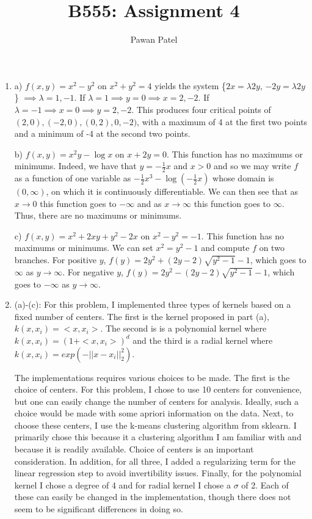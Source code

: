 \documentclass[12pt]{article}
\theoremstyle{plain}
\theoremstyle{definition}
\begin{document}
 

\title{B555: Assignment 4}
\author{Pawan Patel}
\maketitle

\begin{enumerate}


\item
a) $f(x,y) = x^2-y^2$ on $x^2+y^2=4$ yields the system \{$2x=\lambda 2y$, $-2y = \lambda 2y$\} $\implies \lambda = 1, -1$. If $\lambda =1 \implies y=0 \implies x = 2, -2$. If $\lambda = -1 \implies x=0 \implies y=2, -2$. This produces four critical points of $(2,0), (-2,0), (0,2), 0,-2)$, with a maximum of 4 at the first two points and a minimum of -4 at the second two points.

\vspace{1pc}
b) $f(x, y) = x^2y - \log x$ on $x+2y=0$. This function has no maximums or minimums. Indeed, we have that $y = -\frac{1}{2}x$ and $x>0$ and so we may write $f$ as a function of one variable as $-\frac{1}{2}x^3 - \log(- \frac{1}{2}x)$ whose domain is $(0, \infty)$, on which it is continuously differentiable. We can then see that as $x \rightarrow 0$ this function goes to $-\infty$ and as $x \rightarrow \infty$ this function goes to $\infty$. Thus, there are no maximums or minimums.

\vspace{1pc}
c) $f(x,y) = x^2+2xy+y^2-2x$ on $x^2-y^2=-1$. This function has no maximums or minimums. We can set $x^2=y^2-1$ and compute $f$ on two branches. For positive $y$, $f(y) = 2y^2 + (2y-2)\sqrt{y^2-1} - 1$, which goes to $\infty$ as $y\rightarrow \infty$. For negative $y$, $f(y) = 2y^2 - (2y-2)\sqrt{y^2-1} - 1$, which goes to $-\infty$ as $y \rightarrow \infty$.





\vspace{3pc}
\item
(a)-(c): For this problem, I implemented three types of kernels based on a fixed number of centers. The first is the kernel proposed in part (a), $k(x, x_i) = <x, x_i>$. The second is is a polynomial kernel where $k(x, x_i) = (1+ <x, x_i>)^d$ and the third is a radial kernel where $k(x,x_i) = exp ( -||x-x_i||_2^2)$. 

The implementations requires various choices to be made. The first is the choice of centers. For this problem, I chose to use 10 centers for convenience, but one can easily change the number of centers for analysis. Ideally, such a choice would be made with some apriori information on the data. Next, to choose these centers, I use the k-means clustering algorithm from sklearn. I primarily chose this because it a clustering algorithm I am familiar with and because it is readily available. Choice of centers is an important consideration. In addition, for all three, I added a regularizing term for the linear regression step to avoid invertibility issues. Finally, for the polynomial kernel I chose a degree of 4 and for radial kernel I chose a $\sigma$ of 2. Each of these can easily be changed in the implementation, though there does not seem to be significant differences in doing so.


\end{enumerate}
\end{document}
